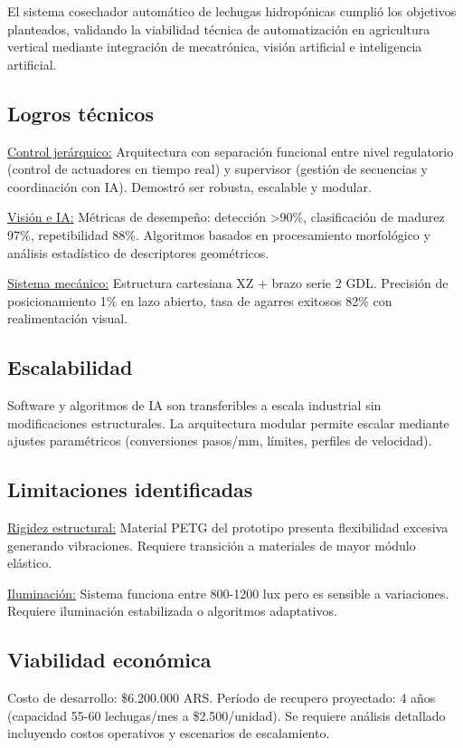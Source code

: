El sistema cosechador automático de lechugas hidropónicas cumplió los objetivos planteados, validando la viabilidad técnica de automatización en agricultura vertical mediante integración de mecatrónica, visión artificial e inteligencia artificial.

\subsection*{Logros técnicos}

\underline{Control jerárquico:} Arquitectura con separación funcional entre nivel regulatorio (control de actuadores en tiempo real) y supervisor (gestión de secuencias y coordinación con IA). Demostró ser robusta, escalable y modular.

\underline{Visión e IA:} Métricas de desempeño: detección >90\%, clasificación de madurez 97\%, repetibilidad 88\%. Algoritmos basados en procesamiento morfológico y análisis estadístico de descriptores geométricos.

\underline{Sistema mecánico:} Estructura cartesiana XZ + brazo serie 2 GDL. Precisión de posicionamiento 1\% en lazo abierto, tasa de agarres exitosos 82\% con realimentación visual.

\subsection*{Escalabilidad}

Software y algoritmos de IA son transferibles a escala industrial sin modificaciones estructurales. La arquitectura modular permite escalar mediante ajustes paramétricos (conversiones pasos/mm, límites, perfiles de velocidad).

\subsection*{Limitaciones identificadas}

\underline{Rigidez estructural:} Material PETG del prototipo presenta flexibilidad excesiva generando vibraciones. Requiere transición a materiales de mayor módulo elástico.

\underline{Iluminación:} Sistema funciona entre 800-1200 lux pero es sensible a variaciones. Requiere iluminación estabilizada o algoritmos adaptativos.

\subsection*{Viabilidad económica}

Costo de desarrollo: \$6.200.000 ARS. Período de recupero proyectado: 4 años (capacidad 55-60 lechugas/mes a \$2.500/unidad). Se requiere análisis detallado incluyendo costos operativos y escenarios de escalamiento.
